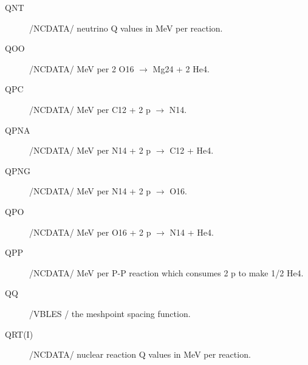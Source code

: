 \documentclass{article}
\begin{document}
\begin{description}
	\item[QNT]		    /NCDATA/ neutrino Q values in MeV per reaction.

	\item[QOO]		    /NCDATA/ MeV per 2 O16 $\to$ Mg24 + 2 He4.

	\item[QPC	]	    /NCDATA/ MeV per C12 + 2 p $\to$ N14.

	\item[QPNA]		/NCDATA/ MeV per N14 + 2 p $\to$ C12 + He4.

	\item[QPNG]		/NCDATA/ MeV per N14 + 2 p $\to$ O16.

	\item[QPO]		    /NCDATA/ MeV per O16 + 2 p $\to$ N14 + He4.

	\item[QPP]		    /NCDATA/ MeV per P-P reaction which consumes 2 p to make 1/2 He4.

	\item[QQ]      	/VBLES / the meshpoint spacing function.

	\item[QRT(I)]		    /NCDATA/ nuclear reaction Q values in MeV per reaction.

\end{description}
\end{document}
